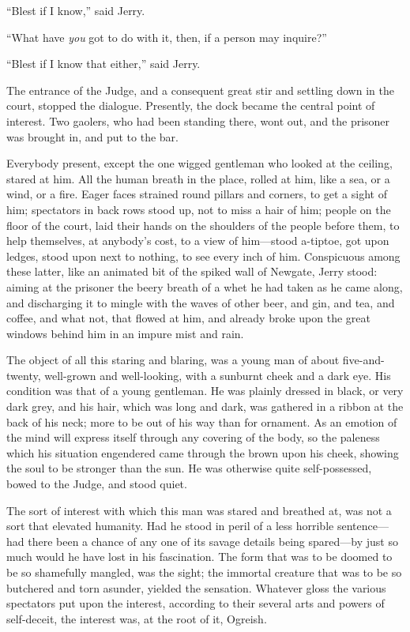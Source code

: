 ``Blest if I know,'' said Jerry.

``What have \emph{you} got to do with it, then, if a person may inquire?''

``Blest if I know that either,'' said Jerry.

The entrance of the Judge, and a consequent great stir and settling
down in the court, stopped the dialogue.  Presently, the dock became
the central point of interest.  Two gaolers, who had been standing
there, wont out, and the prisoner was brought in, and put to the bar.

Everybody present, except the one wigged gentleman who looked at the
ceiling, stared at him.  All the human breath in the place, rolled at
him, like a sea, or a wind, or a fire.  Eager faces strained round
pillars and corners, to get a sight of him; spectators in back rows
stood up, not to miss a hair of him; people on the floor of the
court, laid their hands on the shoulders of the people before them,
to help themselves, at anybody's cost, to a view of him---stood
a-tiptoe, got upon ledges, stood upon next to nothing, to see every
inch of him.  Conspicuous among these latter, like an animated bit of
the spiked wall of Newgate, Jerry stood:  aiming at the prisoner the
beery breath of a whet he had taken as he came along, and discharging
it to mingle with the waves of other beer, and gin, and tea, and
coffee, and what not, that flowed at him, and already broke upon the
great windows behind him in an impure mist and rain.

The object of all this staring and blaring, was a young man of about
five-and-twenty, well-grown and well-looking, with a sunburnt cheek
and a dark eye.  His condition was that of a young gentleman.  He was
plainly dressed in black, or very dark grey, and his hair, which was
long and dark, was gathered in a ribbon at the back of his neck; more
to be out of his way than for ornament.  As an emotion of the mind
will express itself through any covering of the body, so the paleness
which his situation engendered came through the brown upon his cheek,
showing the soul to be stronger than the sun.  He was otherwise quite
self-possessed, bowed to the Judge, and stood quiet.

The sort of interest with which this man was stared and breathed at,
was not a sort that elevated humanity.  Had he stood in peril of a
less horrible sentence---had there been a chance of any one of its
savage details being spared---by just so much would he have lost in
his fascination.  The form that was to be doomed to be so shamefully
mangled, was the sight; the immortal creature that was to be so
butchered and torn asunder, yielded the sensation.  Whatever gloss
the various spectators put upon the interest, according to their
several arts and powers of self-deceit, the interest was, at the
root of it, Ogreish.

